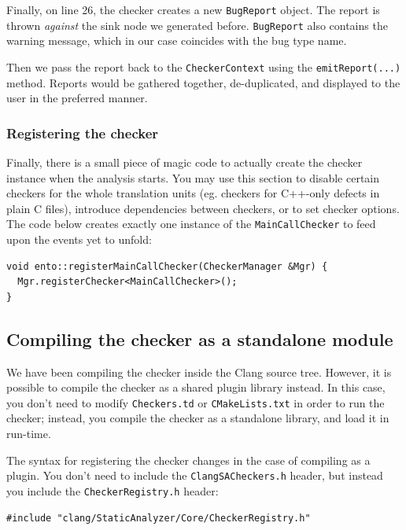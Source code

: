 \documentclass[a4paper,12pt]{article}
\newenvironment{nobr}{\begin{minipage}{\textwidth}\setlength\parskip{1em}
}{\end{minipage}\ignorespacesafterend}
\begin{document}
Finally, on line 26, the checker creates a new \lstinline|BugReport| object. The report is thrown \emph{against} the sink node we generated before. \lstinline|BugReport| also contains the warning message, which in our case coincides with the bug type name.

Then we pass the report back to the \lstinline|CheckerContext| using the \lstinline|emitReport(...)| method. Reports would be gathered together, de-duplicated, and displayed to the user in the preferred manner.

\begin{nobr}
\subsubsection{Registering the checker}

Finally, there is a small piece of magic code to actually create the checker instance when the analysis starts. You may use this section to disable certain checkers for the whole translation units (eg. checkers  for C++-only defects in plain C files), introduce dependencies between checkers, or to set checker options. The code below creates exactly one instance of the \lstinline|MainCallChecker| to feed upon the events yet to unfold:

\begin{lstlisting}[style=cplusplus,firstnumber=31]
void ento::registerMainCallChecker(CheckerManager &Mgr) {
  Mgr.registerChecker<MainCallChecker>();
}
\end{lstlisting}
\end{nobr}

\begin{nobr}
\subsection{Compiling the checker as a standalone module}

We have been compiling the checker inside the Clang source tree. However, it is possible to compile the checker as a shared plugin library instead. In this case, you don't need to modify \lstinline|Checkers.td| or \lstinline|CMakeLists.txt| in order to run the checker; instead, you compile the checker as a standalone library, and load it in run-time.
\end{nobr}

\begin{nobr}
The syntax for registering the checker changes in the case of compiling as a plugin. You don't need to include the \lstinline|ClangSACheckers.h| header, but instead you include the \lstinline|CheckerRegistry.h| header:
\begin{lstlisting}[style=cplusplus,numbers=none]
#include "clang/StaticAnalyzer/Core/CheckerRegistry.h"
\end{lstlisting}
\end{nobr}
\end{document}
